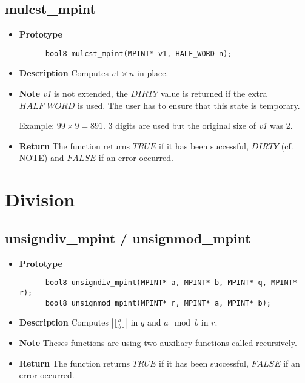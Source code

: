 \documentclass[10pt,a4paper]{article}
\begin{document}
  \subsection{mulcst\_mpint}
  
  \begin{itemize}
    \item [] \textbf{Prototype}
    \begin{lstlisting}
      bool8 mulcst_mpint(MPINT* v1, HALF_WORD n);
    \end{lstlisting}
    \item [] \textbf{Description} Computes $v1 \times n$ in place.
    \item [] \textbf{Note} \textit{v1} is not extended, the $DIRTY$ value is returned if the extra $HALF\_WORD$ is used. The user has to ensure that
    this state is temporary.
    
    Example: $99 \times 9 = 891$. 3 digits are used but the original size of \textit{v1} was 2.
    \item [] \textbf{Return} The function returns $TRUE$ if it has been successful, $DIRTY$ (cf. NOTE) and $FALSE$ if an error occurred.
  \end{itemize}
  
  \section{Division}
  
  \subsection{unsigndiv\_mpint / unsignmod\_mpint}
  
  \begin{itemize}
    \item [] \textbf{Prototype}
    \begin{lstlisting}
      bool8 unsigndiv_mpint(MPINT* a, MPINT* b, MPINT* q, MPINT* r);
      bool8 unsignmod_mpint(MPINT* r, MPINT* a, MPINT* b);
    \end{lstlisting}
    \item [] \textbf{Description} Computes $|\lfloor\frac{a}{b}\rfloor|$ in $q$ and $a \mod b$ in $r$.
    \item [] \textbf{Note} Theses functions are using two auxiliary functions called recursively.
    \item [] \textbf{Return} The function returns $TRUE$ if it has been successful, $FALSE$ if an error occurred.
  \end{itemize}
  
\end{document}
